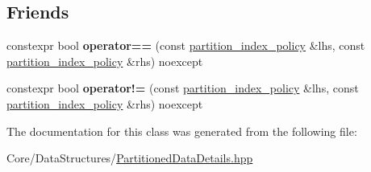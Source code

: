 \subsection*{Friends}
\begin{DoxyCompactItemize}
\item 
\mbox{\label{classsequoia_1_1data__structures_1_1partition__impl_1_1partition__index__policy_adc8fbeca4633e644843744555685d3e7}} 
constexpr bool {\bfseries operator==} (const \mbox{\hyperlink{classsequoia_1_1data__structures_1_1partition__impl_1_1partition__index__policy}{partition\+\_\+index\+\_\+policy}} \&lhs, const \mbox{\hyperlink{classsequoia_1_1data__structures_1_1partition__impl_1_1partition__index__policy}{partition\+\_\+index\+\_\+policy}} \&rhs) noexcept
\item 
\mbox{\label{classsequoia_1_1data__structures_1_1partition__impl_1_1partition__index__policy_a791899a3f08add27277ec30a60c953ec}} 
constexpr bool {\bfseries operator!=} (const \mbox{\hyperlink{classsequoia_1_1data__structures_1_1partition__impl_1_1partition__index__policy}{partition\+\_\+index\+\_\+policy}} \&lhs, const \mbox{\hyperlink{classsequoia_1_1data__structures_1_1partition__impl_1_1partition__index__policy}{partition\+\_\+index\+\_\+policy}} \&rhs) noexcept
\end{DoxyCompactItemize}


The documentation for this class was generated from the following file\+:\begin{DoxyCompactItemize}
\item 
Core/\+Data\+Structures/\mbox{\hyperlink{_partitioned_data_details_8hpp}{Partitioned\+Data\+Details.\+hpp}}\end{DoxyCompactItemize}
